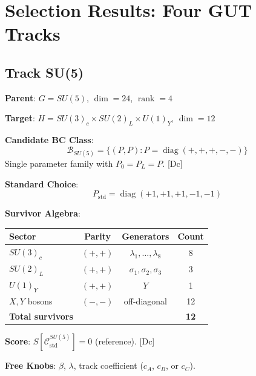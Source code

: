 \documentclass[11pt,a4paper]{article}
\newcommand{\tagDc}{\textcolor{blue!50!black}{[Dc]}}
\DeclareMathOperator{\diag}{diag}
\DeclareMathOperator{\rank}{rank}
\begin{document}
\section{Selection Results: Four GUT Tracks}

\subsection{Track SU(5)}

\begin{trackbox}[SU(5) BC Selection]
\textbf{Parent}: $G = SU(5)$, $\dim = 24$, $\rank = 4$

\textbf{Target}: $H = SU(3)_c \times SU(2)_L \times U(1)_Y$, $\dim = 12$

\textbf{Candidate BC Class}:
\begin{equation}
\label{eq:su5-bc-class}
\mathcal{B}_{SU(5)} = \{(P, P) : P = \diag(+,+,+,-,-)\}
\end{equation}
Single parameter family with $P_0 = P_L = P$. \tagDc

\textbf{Standard Choice}:
\begin{equation}
\label{eq:su5-std}
P_{\text{std}} = \diag(+1, +1, +1, -1, -1)
\end{equation}

\textbf{Survivor Algebra}:
\begin{center}
\begin{tabular}{lccc}
\toprule
Sector & Parity & Generators & Count \\
\midrule
$SU(3)_c$ & $(+,+)$ & $\lambda_1, \ldots, \lambda_8$ & 8 \\
$SU(2)_L$ & $(+,+)$ & $\sigma_1, \sigma_2, \sigma_3$ & 3 \\
$U(1)_Y$ & $(+,+)$ & $Y$ & 1 \\
$X, Y$ bosons & $(-,-)$ & off-diagonal & 12 \\
\midrule
\textbf{Total survivors} & & & \textbf{12} \\
\bottomrule
\end{tabular}
\end{center}

\textbf{Score}: $S[\mathcal{C}_{\text{std}}^{SU(5)}] = 0$ (reference). \tagDc

\textbf{Free Knobs}: $\beta$, $\lambda$, track coefficient ($c_A$, $c_B$, or $c_C$).
\end{trackbox}
\end{document}
